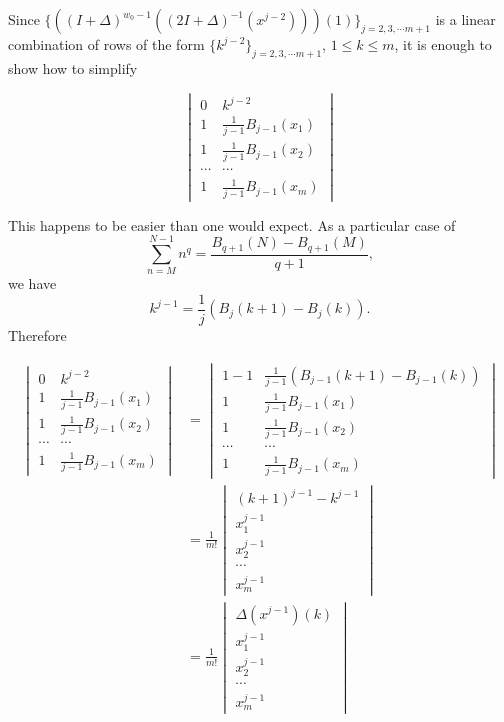 \documentclass[10pt,reqno]{amsart}
\theoremstyle{plain}
\theoremstyle{definition}
\theoremstyle{remark}
\begin{document}
Since 
$\{((I+\Delta)^{w_0-1} ((2I+\Delta)^{-1} (x^{j-2})))(1)\}_{j=2,3,\dotsb m+1}$
is a linear combination of rows of the form 
$\{k^{j-2}\}_{j=2,3,\dotsb m+1}$, $1\leq k\leq m$, it is enough to show how to
simplify

\begin{equation}
\begin{vmatrix}
0 & k^{j-2} \\
1 & \frac{1}{j-1} B_{j-1}(x_1) \\
1 & \frac{1}{j-1} B_{j-1}(x_2) \\
\dotsb & \dotsb \\
1 & \frac{1}{j-1} B_{j-1}(x_m)
\end{vmatrix}
\end{equation}

This happens to be easier than one would expect. As a particular case of
\[\sum_{n=M}^{N-1} n^q = \frac{B_{q+1}(N)-B_{q+1}(M)}{q+1},\]
we have
\[k^{j-1} = \frac{1}{j} (B_j(k+1)-B_j(k)).\] Therefore

\begin{align}
\begin{vmatrix}
0 & k^{j-2} \\
1 & \frac{1}{j-1} B_{j-1}(x_1) \\
1 & \frac{1}{j-1} B_{j-1}(x_2) \\
\dotsb & \dotsb \\
1 & \frac{1}{j-1} B_{j-1}(x_m)
\end{vmatrix}
&=
\begin{vmatrix}
1-1 & \frac{1}{j-1} (B_{j-1}(k+1)-B_{j-1}(k)) \\
1 & \frac{1}{j-1} B_{j-1}(x_1) \\
1 & \frac{1}{j-1} B_{j-1}(x_2) \\
\dotsb & \dotsb \\
1 & \frac{1}{j-1} B_{j-1}(x_m)
\end{vmatrix}\\
&=
\frac{1}{m!}
\begin{vmatrix}
(k+1)^{j-1}-k^{j-1}\\
x_1^{j-1}\\
x_2^{j-1}\\
\dotsb \\
x_m^{j-1}
\end{vmatrix}\\
&=
\frac{1}{m!}
\begin{vmatrix}
\Delta(x^{j-1})(k)\\
x_1^{j-1}\\
x_2^{j-1}\\
\dotsb \\
x_m^{j-1}
\end{vmatrix}
\end{align}
\end{document}

